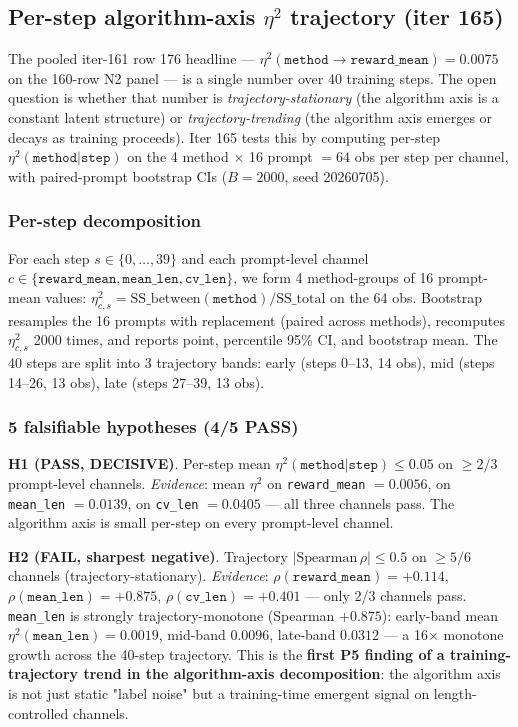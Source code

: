 \documentclass{article}  \usepackage[preprint,nonatbib]{neurips_2026} \usepackage[numbers]{natbib}
\begin{document}
 \subsection{Per-step algorithm-axis $\eta^2$ trajectory (iter 165)}
\label{sec:p5-iter165-per-step}

The pooled iter-161 row 176 headline --- $\eta^2(\texttt{method} \to \texttt{reward\_mean}){=}0.0075$ on the 160-row N2 panel --- is a single number over 40 training steps. The open question is whether that number is \emph{trajectory-stationary} (the algorithm axis is a constant latent structure) or \emph{trajectory-trending} (the algorithm axis emerges or decays as training proceeds). Iter 165 tests this by computing per-step $\eta^2(\texttt{method}|\texttt{step})$ on the 4 method $\times$ 16 prompt $= 64$ obs per step per channel, with paired-prompt bootstrap CIs ($B{=}2000$, seed 20260705).

\subsubsection{Per-step decomposition}
\label{sec:p5-iter165-decomposition}
For each step $s \in \{0, \dots, 39\}$ and each prompt-level channel $c \in \{\texttt{reward\_mean}, \texttt{mean\_len}, \texttt{cv\_len}\}$, we form 4 method-groups of 16 prompt-mean values:
$\eta^2_{c,s} = \mathrm{SS\_between}(\texttt{method}) / \mathrm{SS\_total}$
on the 64 obs. Bootstrap resamples the 16 prompts with replacement (paired across methods), recomputes $\eta^2_{c,s}$ 2000 times, and reports point, percentile 95\% CI, and bootstrap mean. The 40 steps are split into 3 trajectory bands: early (steps 0--13, 14 obs), mid (steps 14--26, 13 obs), late (steps 27--39, 13 obs).

\subsubsection{5 falsifiable hypotheses (4/5 PASS)}
\label{sec:p5-iter165-hypotheses}
\textbf{H1 (PASS, DECISIVE)}. Per-step mean $\eta^2(\texttt{method}|\texttt{step}) \le 0.05$ on $\ge 2/3$ prompt-level channels. \emph{Evidence}: mean $\eta^2$ on \texttt{reward\_mean} $= 0.0056$, on \texttt{mean\_len} $= 0.0139$, on \texttt{cv\_len} $= 0.0405$ --- all three channels pass. The algorithm axis is small per-step on every prompt-level channel.

\textbf{H2 (FAIL, sharpest negative)}. Trajectory $|\mathrm{Spearman}\,\rho| \le 0.5$ on $\ge 5/6$ channels (trajectory-stationary). \emph{Evidence}: $\rho(\texttt{reward\_mean}){=}{+}0.114$, $\rho(\texttt{mean\_len}){=}{+}\mathbf{0.875}$, $\rho(\texttt{cv\_len}){=}{+}0.401$ --- only 2/3 channels pass. \texttt{mean\_len} is strongly trajectory-monotone (Spearman $+0.875$): early-band mean $\eta^2(\texttt{mean\_len}){=}0.0019$, mid-band $0.0096$, late-band $0.0312$ --- a 16$\times$ monotone growth across the 40-step trajectory. This is the \textbf{first P5 finding of a training-trajectory trend in the algorithm-axis decomposition}: the algorithm axis is not just static "label noise" but a training-time emergent signal on length-controlled channels.
\end{document}
